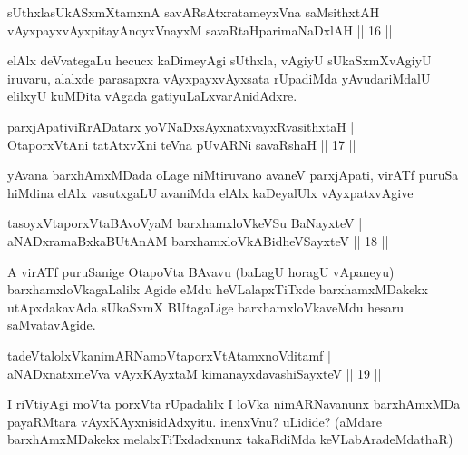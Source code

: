 \begin{shl}
sUthxlasUkASxmXtamxnA savARsAtxratameyxVna saMsithxtAH |\\
vAyxpayxvAyxpitayA\s noyxVnayxM savaRtaHparimaNaDxlAH \hfill || 16 ||
\end{shl}

\begin{artha}
elAlx deVvategaLu hecucx kaDimeyAgi sUthxla, vAgiyU sUkaSxmXvAgiyU iruvaru, alalxde parasapxra vAyxpayxvAyxsata rUpadiMda yAvudariMdalU elilxyU kuMDita vAgada gatiyuLaLxvarAnidAdxre.
\end{artha}


\begin{shl}
parxjApativiRrADatarx yoV\s NaDxsAyxnatxvayxRvasithxtaH |\\
OtaporxVtAni tatAtxvXni teVna pUvARNi savaRshaH \hfill || 17 ||
\end{shl}

\begin{artha}
yAvana barxhAmxMDada oLage niMtiruvano avaneV parxjApati, virATf puruSa hiMdina elAlx vasutxgaLU avaniMda elAlx kaDeyalUlx vAyxpatxvAgive
\end{artha}

\begin{shl}
tasoyxVtaporxVtaBAvoV\s yaM barxhamxloVkeVSu BaNayxteV |\\
aNADxramaBxkaBUtAnAM barxhamxloVkABidheVSayxteV \hfill || 18 ||
\end{shl}

\begin{artha}
A virATf puruSanige OtapoVta BAvavu (baLagU horagU vApaneyu) barxhamxloVkagaLalilx Agide eMdu heVLalapxTiTxde barxhamxMDakekx utApxdakavAda sUkaSxmX BUtagaLige barxhamxloVkaveMdu hesaru saMvatavAgide.
\end{artha}

\begin{shl}
tadeVtalolxVkanimARNamoVtaporxVtAtamxnoVditamf |\\
aNADxnatxmeVva vAyxKAyxtaM kimanayxdavashiSayxteV \hfill || 19 ||
\end{shl}

\begin{artha}
I riVtiyAgi moVta porxVta rUpadalilx I loVka nimARNavanunx barxhAmxMDa payaRMtara vAyxKAyxnisidAdxyitu. inenxVnu? uLidide? (aMdare barxhAmxMDakekx melalxTiTxdadxnunx takaRdiMda keVLabAradeMdathaR)
\end{artha}

